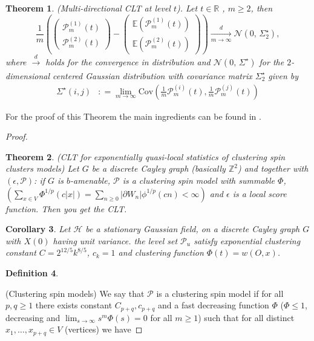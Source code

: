 \documentclass[12pt]{article}
\theoremstyle{Theorem}
\newtheorem{Theorem}{Theorem}[section]
\newtheorem{Corollary}[Theorem]{Corollary}
\newtheorem{Definition}[Theorem]{Definition}
\begin{document}
{\begin{Theorem}(Multi-directional CLT at level $t$). Let $t \in \mathbb{R}$ , $m \geq 2$, then
\begin{equation*}
\frac{1}{m}\left(\begin{pmatrix} \mathcal{P}^{\scriptscriptstyle (1)}_{m}(t) \\ \mathcal{P}^{\scriptscriptstyle (2)}_{m}(t) \end{pmatrix} - \begin{pmatrix} \mathbb{E}\left(\mathcal{P}^{\scriptscriptstyle (1)}_{m}(t)\right)  \\\mathbb{E}(\mathcal{P}^{\scriptscriptstyle (2)}_{m}(t)) \end{pmatrix}\right) \xrightarrow[m \to \infty]{d} \mathcal{N}\left(0,\,\Sigma^{\star}_{2}\right),
\end{equation*}
where $\xrightarrow[]{d}$ holds for the convergence in distribution and $\mathcal{N}\left(0,\,\Sigma^{\star}\right)$ for the $2$-dimensional centered Gaussian distribution with covariance matrix $\Sigma^{\star}_{2}$ given by
\begin{align*}
\Sigma^{\star}(i,j) & : = \lim_{m \to \infty}\text{Cov}\left(\frac{1}{m}\mathcal{P}^{\scriptscriptstyle (i)}_{m}(t), \frac{1}{m}\mathcal{P}^{\scriptscriptstyle (j)}_{m}(t) \right)
\end{align*}
\end{Theorem}
For the proof of this Theorem the main ingredients can be found in \cite{RVY}.
\begin{proof}
\begin{Theorem}(CLT for exponentially quasi-local statistics of clustering spin clusters models) Let $G$ be a discrete Cayley graph (basically $\mathbb{Z}^{2}$) and together with $(\epsilon, \mathcal{P})$: if $G$ is $b$-amenable, $\mathcal{P}$ is a clustering spin model with summable $\Phi$, $\left(\sum_{x \in V}\Phi^{1/p}(c|x|) = \sum_{n \geq 0} |\partial W_n| \phi^{1/p}(cn) < \infty \right)$ and $\epsilon$ is a local score function. Then you get the CLT.
\end{Theorem}
\begin{Corollary}
Let $\mathcal{H}$ be a stationary Gaussian field, on a discrete Cayley graph $G$ with $X(0)$ having unit variance. the level set $\mathcal{P}_{u}$ satisfy exponential clustering constant $C = 2^{12/5}k^{8/5}$, $c_{k} = 1$ and clustering function $\Phi(t) = w(O,x)$.
\end{Corollary}
\begin{Definition}
\end{Definition}(Clustering spin models) We say that $\mathcal{P}$ is a clustering spin model if for all $p,q \geq 1$ there exists constant $C_{p+q}, c_{p+q}$ and a fast decreasing function $\Phi$ ($\Phi \leq 1$,  decreasing and $\lim_{s \to \infty}s^{m}\Phi(s) = 0$ for all $m\geq 1$) such that for all distinct $x_{1}, \ldots, x_{p+q} \in V$ (vertices) we have 

\end{proof}}
\end{document}
